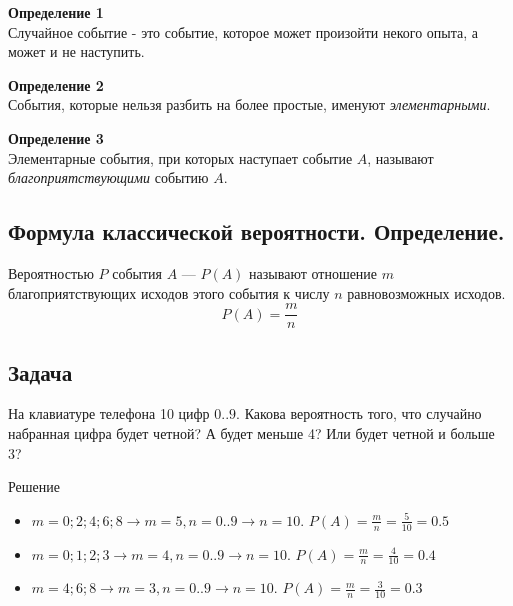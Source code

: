 \documentclass[a4paper,12pt]{extreport}
\begin{document}
\textbf{Определение 1}\\
Случайное событие - это событие, которое может произойти некого опыта, а может и не наступить.

\textbf{Определение 2}\\
События, которые нельзя разбить на более простые, именуют \textit{элементарными}.

\textbf{Определение 3}\\
Элементарные события, при которых наступает событие $A$, называют \textit{благоприятствующими} событию $A$.

\subsection*{Формула классической вероятности. Определение.}
Вероятностью $P$ события $A$ --- $P(A)$ называют отношение $m$ благоприятствующих исходов этого события к числу $n$  равновозможных исходов.
$$P(A)=\frac{m}{n}$$

\subsection{Задача}
На клавиатуре телефона 10 цифр ${0..9}$. Какова вероятность того, что случайно набранная цифра будет четной? А будет меньше 4? Или будет четной и больше 3?
\begin{center}
Решение
\end{center}
\begin{itemize}
	\item $m={0; 2; 4; 6; 8} \longrightarrow m=5, n={0..9} \longrightarrow n=10$. $P(A)=\frac{m}{n}=\frac{5}{10}=0.5$
	\item $m={0; 1; 2; 3} \longrightarrow m=4, n={0..9} \longrightarrow n=10$. $P(A)=\frac{m}{n}=\frac{4}{10}=0.4$
	\item $m={4; 6; 8} \longrightarrow m=3, n={0..9} \longrightarrow n=10$. $P(A)=\frac{m}{n}=\frac{3}{10}=0.3$
\end{itemize}
\end{document}
